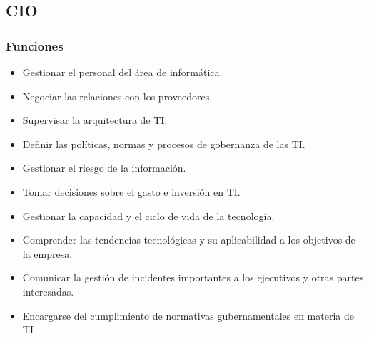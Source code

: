 
\subsection{CIO}
    \subsubsection{Funciones}
        \begin{itemize}
            \item Gestionar el personal del área de informática. 
            \item Negociar las relaciones con los proveedores. 
            \item Supervisar la arquitectura de TI. 
            \item Definir las políticas, normas y procesos de gobernanza de las TI. 
            \item Gestionar el riesgo de la información. 
            \item Tomar decisiones sobre el gasto e inversión en TI. 
            \item Gestionar la capacidad y el ciclo de vida de la tecnología. 
            \item Comprender las tendencias tecnológicas y su aplicabilidad a los objetivos de la empresa. 
            \item Comunicar la gestión de incidentes importantes a los ejecutivos y otras partes interesadas. 
            \item Encargarse del cumplimiento de normativas gubernamentales en materia de TI 
        \end{itemize}

